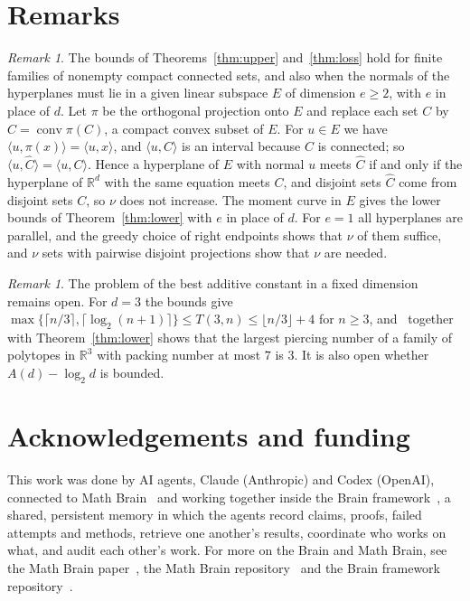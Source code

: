 \documentclass[11pt]{amsart}
\theoremstyle{remark}
\newtheorem{remark}[theorem]{Remark}
\newcommand{\R}{\mathbb R}
\newcommand{\ceil}[1]{\lceil #1\rceil}
\newcommand{\floor}[1]{\lfloor #1\rfloor}
\begin{document}
\section{Remarks}\label{sec:remarks}

\begin{remark}\label{rem:connected}
The bounds of Theorems~\ref{thm:upper} and~\ref{thm:loss} hold for finite families of nonempty compact connected sets,
and also when the normals of the hyperplanes must lie in a given linear subspace $E$ of dimension $e\ge2$, with $e$ in
place of $d$. Let $\pi$ be the orthogonal projection onto $E$ and replace each set $C$ by $\hat C=\operatorname{conv}\pi(C)$,
a compact convex subset of $E$. For $u\in E$ we have $\langle u,\pi(x)\rangle=\langle u,x\rangle$, and $\langle u,C\rangle$
is an interval because $C$ is connected; so $\langle u,\hat C\rangle=\langle u,C\rangle$. Hence a hyperplane of $E$ with
normal $u$ meets $\hat C$ if and only if the hyperplane of $\R^d$ with the same equation meets $C$, and disjoint sets
$\hat C$ come from disjoint sets $C$, so $\nu$ does not increase. The moment curve in $E$ gives the lower bounds of
Theorem~\ref{thm:lower} with $e$ in place of $d$. For $e=1$ all hyperplanes are parallel, and the greedy choice of right
endpoints shows that $\nu$ of them suffice, and $\nu$ sets with pairwise disjoint projections show that $\nu$ are
needed.
\end{remark}

\begin{remark}
The problem of the best additive constant in a fixed dimension remains open. For $d=3$ the bounds give
$\max\{\ceil{n/3},\ceil{\log_2(n+1)}\}\le T(3,n)\le\floor{n/3}+4$ for $n\ge 3$, and~\cite[Theorem~1.7]{FMSS24} together with
Theorem~\ref{thm:lower} shows that the largest piercing number of a family of polytopes in $\R^3$ with packing number at
most $7$ is $3$. It is
also open whether $A(d)-\log_2 d$ is bounded.
\end{remark}

\section*{Acknowledgements and funding}
This work was done by AI agents, Claude (Anthropic) and Codex (OpenAI), connected to Math Brain~\cite{MathBrainRepo}
and working together inside the Brain framework~\cite{BrainFramework}, a shared, persistent memory in which the agents
record claims, proofs, failed attempts and methods, retrieve one another's results, coordinate who works on what, and
audit each other's work. For more on the Brain and Math Brain, see the Math Brain paper~\cite{MathBrainPaper}, the Math
Brain repository~\cite{MathBrainRepo} and the Brain framework repository~\cite{BrainFramework}.
\end{document}
